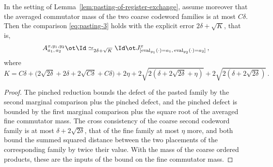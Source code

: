 \begin{lemma}
	\label{lem:pasting-explicit-error}
	\leanok
	In the setting of Lemma~\ref{lem:pasting-of-register-exchange}, assume moreover that the averaged
	commutator mass of the two coarse codeword families is at most $C\delta$.
	Then the comparison \eqref{eq:pasting-3} holds with the explicit error
	$2\delta + \sqrt{K}$, that is,
	\[
		A^{x,y_1,y_2}_{a_1,\,a_2} \ot \Id
			\simeq_{2\delta + \sqrt{K}}
			\Id \ot J^x_{[\operatorname{eval}_{y_1}(\cdot)=a_1,\,
				\operatorname{eval}_{y_2}(\cdot)=a_2]}\,,
	\]
	where
	\[
		K = C\delta + \bigl(2\sqrt{2\delta} + 2\delta + 2\sqrt{C\delta}
			+ C\delta\bigr) + 2\eta
			+ 2\sqrt{2(\delta + 2\sqrt{2\delta} + \eta)}
			+ 2\sqrt{2(\delta + 2\sqrt{2\delta})}\,.
	\]
\end{lemma}
\begin{proof}
	\leanok
	The pinched reduction bounds the defect of the pasted family by the second
	marginal comparison plus the pinched defect, and the pinched defect is
	bounded by the first marginal comparison plus the square root of the
	averaged fine commutator mass. The cross consistency of the coarse second
	codeword family is at most $\delta + 2\sqrt{2\delta}$, that of the fine
	family at most $\eta$ more, and both bound the summed squared distance
	between the two placements of the corresponding family by twice their value.
	With the mass of the coarse ordered products, these are the inputs of the
	bound on the fine commutator mass.
\end{proof}

